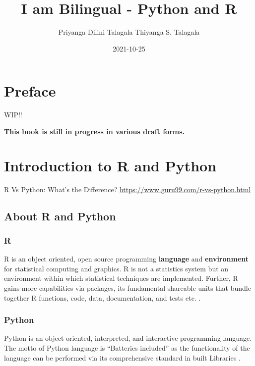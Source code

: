 \documentclass[
]{book}
\title{I am Bilingual - Python and R}
\author{Priyanga Dilini Talagala Thiyanga S. Talagala}
\date{2021-10-25}
\begin{document}
\maketitle

{
\setcounter{tocdepth}{1}
\tableofcontents
}
\hypertarget{preface}{%
\chapter*{Preface}\label{preface}}

WIP!!

\textbf{This book is still in progress in various draft forms.}

\hypertarget{intro}{%
\chapter{Introduction to R and Python}\label{intro}}

R Vs Python: What's the Difference? \url{https://www.guru99.com/r-vs-python.html}

\hypertarget{about-r-and-python}{%
\section{About R and Python}\label{about-r-and-python}}

\hypertarget{r}{%
\subsection{R}\label{r}}

R is an object oriented, open source programming \textbf{language} and \textbf{environment} for statistical computing and graphics. R is not a statistics system but an environment within which statistical techniques are implemented. Further, R gains more capabilities via packages, its fundamental shareable units that bundle together R functions, code, data, documentation, and tests etc. \citep{Rcoreteam2020}.

\hypertarget{python}{%
\subsection{Python}\label{python}}

Python is an object-oriented, interpreted, and interactive programming language. The motto of Python language is ``Batteries included'' as the functionality of the language can be performed via its comprehensive standard in built Libraries \citep{wikipython}.
\end{document}
